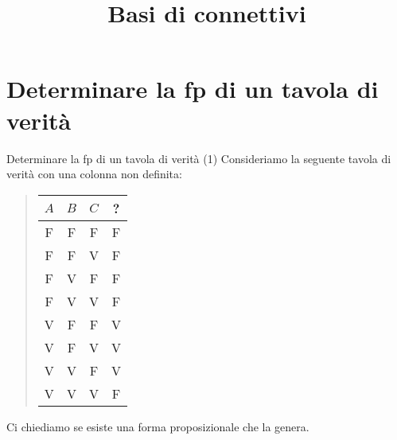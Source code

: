 \documentclass[aspectratio=169,10pt,dvipsnames,xcolor=table,handout]{beamer}
\title{Basi di connettivi}
\begin{document}
\begin{frame}
    \titlepage
\end{frame}

\section{Determinare la fp di un tavola di verità}

\begin{frame}{Determinare la fp di un tavola di verità (1)}
    Consideriamo la seguente tavola di verità con una colonna non definita:

    \medskip
    \begin{quote}
        \begin{tabular}{c|c|c||c}
            $A$ & $B$ & $C$ & ? \\
            \hline
            F   & F   & F   & F \\
            F   & F   & V   & F \\
            F   & V   & F   & F \\
            F   & V   & V   & F \\
            V   & F   & F   & V \\
            V   & F   & V   & V \\
            V   & V   & F   & V \\
            V   & V   & V   & F
        \end{tabular}
    \end{quote}

    \medskip
    Ci chiediamo se esiste una forma proposizionale che la genera.
\end{frame}
\end{document}
